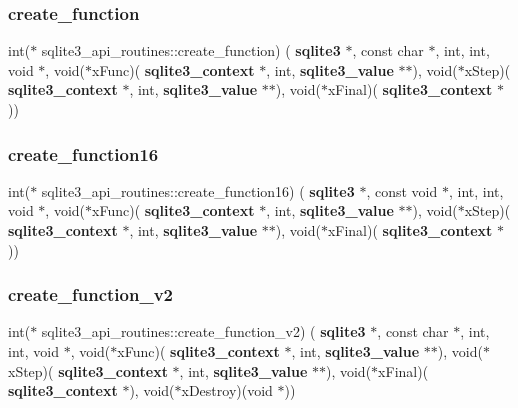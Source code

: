 \mbox{\label{structsqlite3__api__routines_a9f15bf465292b7176eddbf0287c770f8}} 
\subsubsection{create\_function}
{\footnotesize\ttfamily int($\ast$ sqlite3\+\_\+api\+\_\+routines\+::create\+\_\+function) (\textbf{ sqlite3} $\ast$, const char $\ast$, int, int, void $\ast$, void($\ast$x\+Func)(\textbf{ sqlite3\+\_\+context} $\ast$, int, \textbf{ sqlite3\+\_\+value} $\ast$$\ast$), void($\ast$x\+Step)(\textbf{ sqlite3\+\_\+context} $\ast$, int, \textbf{ sqlite3\+\_\+value} $\ast$$\ast$), void($\ast$x\+Final)(\textbf{ sqlite3\+\_\+context} $\ast$))}

\mbox{\label{structsqlite3__api__routines_a2cb97ce7512759a08f1744e24cd0294f}} 
\subsubsection{create\_function16}
{\footnotesize\ttfamily int($\ast$ sqlite3\+\_\+api\+\_\+routines\+::create\+\_\+function16) (\textbf{ sqlite3} $\ast$, const void $\ast$, int, int, void $\ast$, void($\ast$x\+Func)(\textbf{ sqlite3\+\_\+context} $\ast$, int, \textbf{ sqlite3\+\_\+value} $\ast$$\ast$), void($\ast$x\+Step)(\textbf{ sqlite3\+\_\+context} $\ast$, int, \textbf{ sqlite3\+\_\+value} $\ast$$\ast$), void($\ast$x\+Final)(\textbf{ sqlite3\+\_\+context} $\ast$))}

\mbox{\label{structsqlite3__api__routines_aaaefe1980584ef9d0c6d22503d68e926}} 
\subsubsection{create\_function\_v2}
{\footnotesize\ttfamily int($\ast$ sqlite3\+\_\+api\+\_\+routines\+::create\+\_\+function\+\_\+v2) (\textbf{ sqlite3} $\ast$, const char $\ast$, int, int, void $\ast$, void($\ast$x\+Func)(\textbf{ sqlite3\+\_\+context} $\ast$, int, \textbf{ sqlite3\+\_\+value} $\ast$$\ast$), void($\ast$x\+Step)(\textbf{ sqlite3\+\_\+context} $\ast$, int, \textbf{ sqlite3\+\_\+value} $\ast$$\ast$), void($\ast$x\+Final)(\textbf{ sqlite3\+\_\+context} $\ast$), void($\ast$x\+Destroy)(void $\ast$))}

